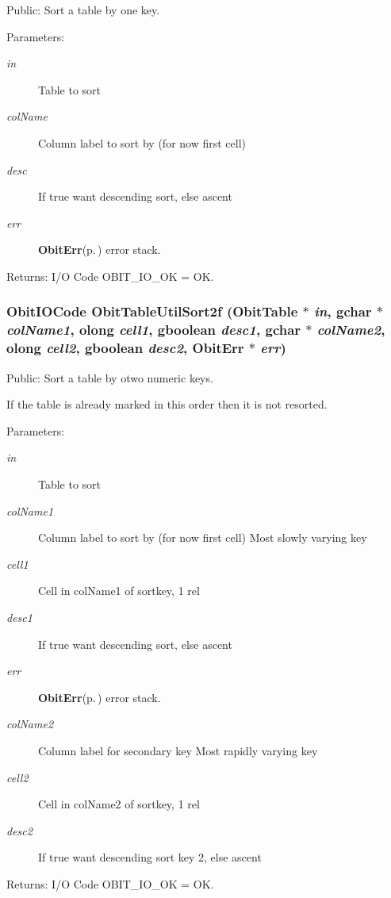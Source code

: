 Public: Sort a table by one key. 

\begin{Desc}
\item[Parameters:]
\begin{description}
\item[{\em in}]Table to sort \item[{\em col\-Name}]Column label to sort by (for now first cell) \item[{\em desc}]If true want descending sort, else ascent \item[{\em err}]{\bf Obit\-Err}{\rm (p.\,\pageref{structObitErr})} error stack. \end{description}
\end{Desc}
\begin{Desc}
\item[Returns:]I/O Code OBIT\_\-IO\_\-OK = OK. \end{Desc}
\subsubsection{\setlength{\rightskip}{0pt plus 5cm}Obit\-IOCode Obit\-Table\-Util\-Sort2f ({\bf Obit\-Table} $\ast$ {\em in}, gchar $\ast$ {\em col\-Name1}, {\bf olong} {\em cell1}, gboolean {\em desc1}, gchar $\ast$ {\em col\-Name2}, {\bf olong} {\em cell2}, gboolean {\em desc2}, {\bf Obit\-Err} $\ast$ {\em err})}\label{ObitTableUtil_8h_a2}


Public: Sort a table by otwo numeric keys. 

If the table is already marked in this order then it is not resorted. \begin{Desc}
\item[Parameters:]
\begin{description}
\item[{\em in}]Table to sort \item[{\em col\-Name1}]Column label to sort by (for now first cell) Most slowly varying key \item[{\em cell1}]Cell in col\-Name1 of sortkey, 1 rel \item[{\em desc1}]If true want descending sort, else ascent \item[{\em err}]{\bf Obit\-Err}{\rm (p.\,\pageref{structObitErr})} error stack. \item[{\em col\-Name2}]Column label for secondary key Most rapidly varying key \item[{\em cell2}]Cell in col\-Name2 of sortkey, 1 rel \item[{\em desc2}]If true want descending sort key 2, else ascent \end{description}
\end{Desc}
\begin{Desc}
\item[Returns:]I/O Code OBIT\_\-IO\_\-OK = OK. \end{Desc}
